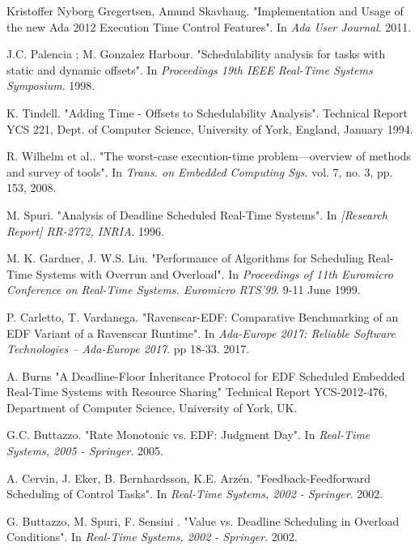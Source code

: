 \documentclass{article}
\begin{document}
\begin{thebibliography}{1}
Kristoffer Nyborg Gregertsen, Amund Skavhaug.
\newblock "Implementation and Usage of the new Ada 2012 Execution Time Control Features".
\newblock In {\em Ada User Journal}. 2011.

J.C. Palencia ; M. Gonzalez Harbour.
\newblock "Schedulability analysis for tasks with static and dynamic offsets".
\newblock In {\em Proceedings 19th IEEE Real-Time Systems Symposium}. 1998.

K. Tindell.
\newblock "Adding Time - Offsets to Schedulability Analysis".
\newblock Technical Report YCS 221, Dept. of Computer Science, University of York, England, January 1994.

R. Wilhelm et al..
\newblock "The worst-case execution-time problem—overview of methods and survey of tools".
\newblock In {\em Trans. on Embedded Computing Sys}. vol. 7, no. 3, pp. 153, 2008.

M. Spuri.
\newblock "Analysis of Deadline Scheduled Real-Time Systems".
\newblock In {\em [Research Report] RR-2772, INRIA}. 1996.

M. K. Gardner, J. W.S. Liu.
\newblock "Performance of Algorithms for Scheduling Real-Time Systems with Overrun and Overload".
\newblock In {\em Proceedings of 11th Euromicro Conference on Real-Time Systems. Euromicro RTS'99}. 9-11 June 1999.

P. Carletto, T. Vardanega.
\newblock "Ravenscar-EDF: Comparative Benchmarking of an EDF Variant of a Ravenscar Runtime".
\newblock In {\em Ada-Europe 2017: Reliable Software Technologies – Ada-Europe 2017}. pp 18-33. 2017.

A. Burns
\newblock "A Deadline-Floor Inheritance Protocol for EDF Scheduled Embedded Real-Time Systems with Resource Sharing"
\newblock Technical Report YCS-2012-476, Department of Computer Science, University of York, UK.

G.C. Buttazzo.
\newblock "Rate Monotonic vs. EDF: Judgment Day".
\newblock In {\em Real-Time Systems, 2005 - Springer}. 2005.

A. Cervin, J. Eker, B. Bernhardsson, K.E. Arzén.
\newblock "Feedback-Feedforward Scheduling of Control Tasks".
\newblock In {\em Real-Time Systems, 2002 - Springer}. 2002.

G. Buttazzo, M. Spuri, F. Sensini .
\newblock "Value vs. Deadline Scheduling in Overload Conditions".
\newblock In {\em Real-Time Systems, 2002 - Springer}. 2002.

\end{thebibliography}
\end{document}
